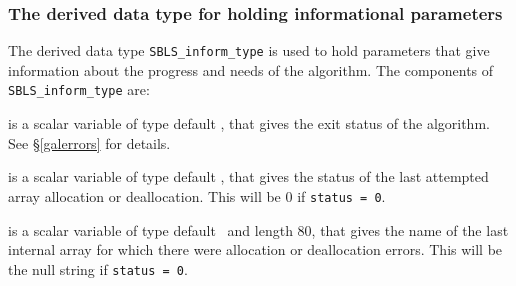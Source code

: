 \documentclass{galahad}
\newcommand{\packagename}{SBLS}
\begin{document}

\subsubsection{The derived data type for holding informational
 parameters}\label{typeinform}
The derived data type
{\tt \packagename\_inform\_type}
is used to hold parameters that give information about the progress and needs
of the algorithm. The components of
{\tt \packagename\_inform\_type}
are:

\begin{description}

 is a scalar variable of type default \integer, that gives the
exit status of the algorithm.
See \S\ref{galerrors}
for details.

 is a scalar variable of type default \integer, that gives
the status of the last attempted array allocation or deallocation.
This will be 0 if {\tt status = 0}.

 is a scalar variable of type default \character\
and length 80, that  gives the name of the last internal array
for which there were allocation or deallocation errors.
This will be the null string if {\tt status = 0}.






\end{description}
\end{document}

